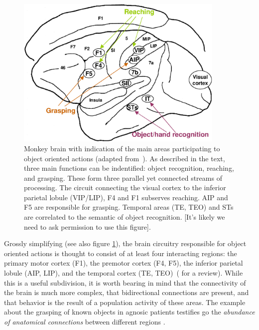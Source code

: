 %
%
\begin{figure}[tb]
\begin{center}
\includegraphics[width=10cm]{brain-schema.eps}
\caption{ 
\label{fig:brain-schema}
%
Monkey brain with indication of the main areas participating to object
oriented actions (adapted from~\cite{fagg-arbib-1998}). As described in the
text, three main functions can be indentified: object recognition, reaching,
and grasping. These form three parallel yet connected streams of 
processing. The circuit connecting the visual cortex to the inferior parietal 
lobule (VIP/LIP), F4 and F1 subserves reaching. AIP and F5 are responsible for
grasping. Temporal areas (TE, TEO) and STs are correlated to the
semantic of object recognition.
[It's likely we need to ask permission to use this figure].
%
}
\end{center}
\end{figure}
%
%

Grossly simplifying (see also figure \ref{fig:brain-schema}), the brain circuitry responsible 
for object oriented actions is thought to consist of at least four 
interacting regions: the primary motor cortex (F1), the premotor cortex (F4, F5), the 
inferior parietal lobule (AIP, LIP), and the temporal cortex 
(TE, TEO)~(\cite{rizzolatti-fogassi-gallese-1997,fadiga00visuomotor,jeannerod97cognitive} 
for a review). 
While this is a useful subdivision, it is worth bearing in mind 
that the connectivity of the brain is much more complex, that bidirectional 
connections are present, and that behavior is the result of a 
population activity of these areas. The example about the grasping of known 
objects in agnosic patients testifies go the \emph{abundance of anatomical connections} 
between different regions \cite{jeannerod-arbib-rizzolatti-sakata-1995}.

